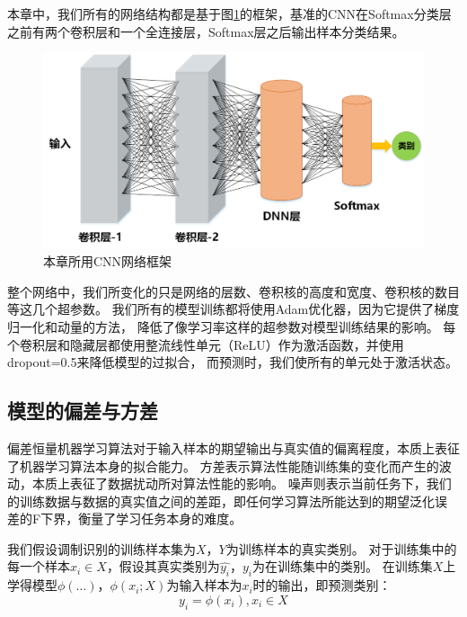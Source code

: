 本章中，我们所有的网络结构都是基于图\ref{fig_5_0}的框架，基准的CNN在Softmax分类层之前有两个卷积层和一个全连接层，Softmax层之后输出样本分类结果。\par
\begin{figure}[!htbp]
	\centering
	\includegraphics[scale=0.6]{figures/chapter_5/fig_5_0}
	\caption{本章所用CNN网络框架}
	\label{fig_5_0}
\end{figure}

整个网络中，我们所变化的只是网络的层数、卷积核的高度和宽度、卷积核的数目等这几个超参数。
我们所有的模型训练都将使用Adam优化器，因为它提供了梯度归一化和动量的方法，
降低了像学习率这样的超参数对模型训练结果的影响。
每个卷积层和隐藏层都使用整流线性单元（ReLU）作为激活函数，并使用dropout=0.5来降低模型的过拟合，
而预测时，我们使所有的单元处于激活状态。\par

\subsection{模型的偏差与方差}
\label{sec_5_2_1}
偏差恒量机器学习算法对于输入样本的期望输出与真实值的偏离程度，本质上表征了机器学习算法本身的拟合能力。
方差表示算法性能随训练集的变化而产生的波动，本质上表征了数据扰动所对算法性能的影响。
噪声则表示当前任务下，我们的训练数据与数据的真实值之间的差距，即任何学习算法所能达到的期望泛化误
差的F下界，衡量了学习任务本身的难度。\par

我们假设调制识别的训练样本集为$X$，$Y$为训练样本的真实类别。
对于训练集中的每一个样本$x_i \in X$，假设其真实类别为$\hat{y_i}$，$y_i$为在训练集中的类别。
在训练集$X$上学得模型$\phi(\dots)$，$\phi(x_i; X)$为输入样本为$x_i$时的输出，即预测类别：
\begin{equation}
	\label{eqt_5_2}
	y_i = \phi(x_i), x_i \in X
\end{equation}

